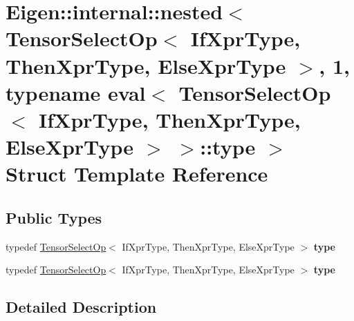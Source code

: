\hypertarget{struct_eigen_1_1internal_1_1nested_3_01_tensor_select_op_3_01_if_xpr_type_00_01_then_xpr_type_0010d0192d54c3f780dbab86be6337fa47}{}\section{Eigen\+:\+:internal\+:\+:nested$<$ Tensor\+Select\+Op$<$ If\+Xpr\+Type, Then\+Xpr\+Type, Else\+Xpr\+Type $>$, 1, typename eval$<$ Tensor\+Select\+Op$<$ If\+Xpr\+Type, Then\+Xpr\+Type, Else\+Xpr\+Type $>$ $>$\+:\+:type $>$ Struct Template Reference}
\label{struct_eigen_1_1internal_1_1nested_3_01_tensor_select_op_3_01_if_xpr_type_00_01_then_xpr_type_0010d0192d54c3f780dbab86be6337fa47}
\subsection*{Public Types}
\begin{DoxyCompactItemize}
\item 
\mbox{\label{struct_eigen_1_1internal_1_1nested_3_01_tensor_select_op_3_01_if_xpr_type_00_01_then_xpr_type_0010d0192d54c3f780dbab86be6337fa47_aa89a4d605ed9008c97d695112dee8924}} 
typedef \hyperlink{class_eigen_1_1_tensor_select_op}{Tensor\+Select\+Op}$<$ If\+Xpr\+Type, Then\+Xpr\+Type, Else\+Xpr\+Type $>$ {\bfseries type}
\item 
\mbox{\label{struct_eigen_1_1internal_1_1nested_3_01_tensor_select_op_3_01_if_xpr_type_00_01_then_xpr_type_0010d0192d54c3f780dbab86be6337fa47_aa89a4d605ed9008c97d695112dee8924}} 
typedef \hyperlink{class_eigen_1_1_tensor_select_op}{Tensor\+Select\+Op}$<$ If\+Xpr\+Type, Then\+Xpr\+Type, Else\+Xpr\+Type $>$ {\bfseries type}
\end{DoxyCompactItemize}


\subsection{Detailed Description}
